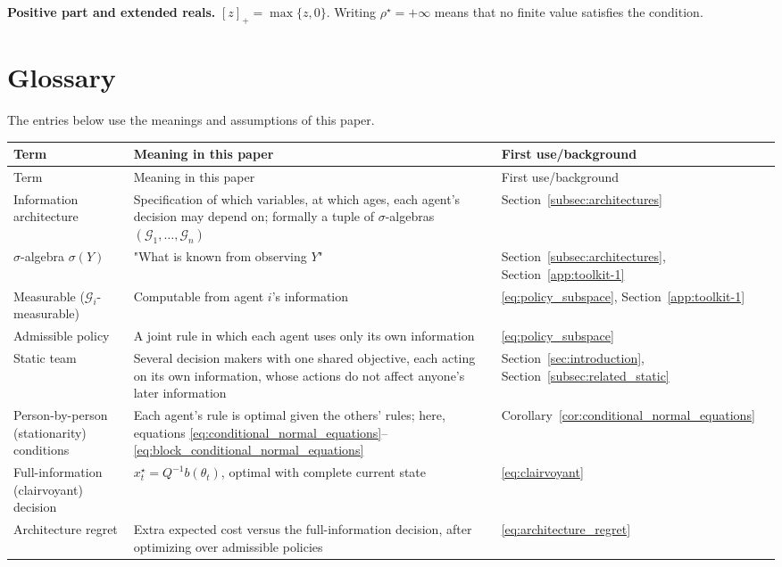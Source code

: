 \textbf{Positive part and extended reals.} $[z]_+=\max\{z,0\}$. Writing $\rho^\star=+\infty$ means that no finite value satisfies the condition.

\clearpage
\section{Glossary}
\label{app:glossary}
The entries below use the meanings and assumptions of this paper.
\small
\setlength{\tabcolsep}{4pt}
\renewcommand{\arraystretch}{1.12}
\begin{longtable}{@{}p{.23\linewidth}p{.52\linewidth}p{.20\linewidth}@{}}
\toprule
Term & Meaning in this paper & First use/background \\
\midrule
\endfirsthead
\toprule
Term & Meaning in this paper & First use/background \\
\midrule
\endhead
\bottomrule
\endfoot
Information architecture & Specification of which variables, at which ages, each agent's decision may depend on; formally a tuple of $\sigma$-algebras $(\mathcal G_1,\dots,\mathcal G_n)$ & Section~\ref{subsec:architectures} \\
$\sigma$-algebra $\sigma(Y)$ & "What is known from observing $Y$" & Section~\ref{subsec:architectures}, Section~\ref{app:toolkit-1} \\
Measurable ($\mathcal G_i$-measurable) & Computable from agent $i$'s information & \eqref{eq:policy_subspace}, Section~\ref{app:toolkit-1} \\
Admissible policy & A joint rule in which each agent uses only its own information & \eqref{eq:policy_subspace} \\
Static team & Several decision makers with one shared objective, each acting on its own information, whose actions do not affect anyone's later information & Section~\ref{sec:introduction}, Section~\ref{subsec:related_static} \\
Person-by-person (stationarity) conditions & Each agent's rule is optimal given the others' rules; here, equations \eqref{eq:conditional_normal_equations}--\eqref{eq:block_conditional_normal_equations} & Corollary~\ref{cor:conditional_normal_equations} \\
Full-information (clairvoyant) decision & $x^\star_t=Q^{-1}b(\theta_t)$, optimal with complete current state & \eqref{eq:clairvoyant} \\
Architecture regret & Extra expected cost versus the full-information decision, after optimizing over admissible policies & \eqref{eq:architecture_regret} \\

\end{longtable}
